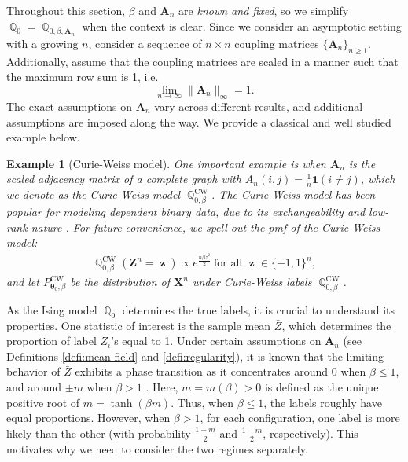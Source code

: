 \documentclass[preprint,reqno]{imsart}
\newtheorem{ex}{Example}[section]
\newcommand{\ttheta}{\boldsymbol{\theta}}
\DeclareMathOperator{\bz}{\textbf{z}}
\DeclareMathOperator{\QQ}{\mathbb{Q}}
\newcommand{\A}{\mathbf{A}}
\newcommand{\Z}{\mathbf{Z}}
\newcommand{\X}{\mathbf{X}}
\begin{document}
Throughout this section, $\beta$ and $\A_n$ are \emph{known and fixed}, so we simplify $\QQ_0 = \QQ_{0, \beta,\A_n}$ when the context is clear. Since we consider an asymptotic setting with a growing $n$, consider a sequence of $n \times n$ coupling matrices $\{\A_n\}_{n \ge 1}$. Additionally, assume that the coupling matrices are scaled in a manner such that the {maximum row sum is 1}, i.e. 
\begin{equation}\label{eq:row sum one scaling}
    \lim_{n \to \infty} \lVert \A_n \rVert_{\infty} =1.
\end{equation}
The exact assumptions on $\A_n$ vary across different results, and additional assumptions are imposed along the way. We provide a classical and well studied example below.

\begin{ex}[Curie-Weiss model]\label{ex:Curie-Weiss}
One important example is when $\A_n$ is the scaled adjacency matrix of a complete graph with $A_n(i,j) = \frac{1}{n}\mathbf{1}(i\neq j)$, which we denote as the Curie-Weiss model $\QQ_{0,\beta}^{\text{CW}}$. The Curie-Weiss model has been popular for modeling dependent binary data, due to its exchangeability and low-rank nature \citep{ellis1978statistics, comets1991asymptotics, mukherjee2018global}. 
For future convenience, we spell out the pmf of the Curie-Weiss model:
\begin{align}
    \QQ_{0,\beta}^{\text{CW}}(\Z^n = \bz) \propto e^{\frac{n \beta \bar{z}^2}{2}} ~ \mbox{for all } \bz \in \{-1, 1\}^n,\label{eq:CW pmf}
\end{align}
and let $P_{\ttheta_0, \beta}^{\text{CW}}$ be the distribution of $\X^n$ under Curie-Weiss labels $\QQ_{0,\beta}^{\text{CW}}$.
\end{ex}

As the Ising model $\QQ_0$ determines the true labels, it is crucial to understand its properties. One statistic of interest is the sample mean $\bar{Z}$, which determines the proportion of label $Z_i$'s equal to 1. 
%
Under certain assumptions on $\A_n$ (see Definitions \ref{defi:mean-field} and \ref{defi:regularity}), it is known that the limiting behavior of $\bar{Z}$ exhibits a phase transition as it concentrates around 0 when $\beta \le 1$, and around $\pm m$ when $\beta > 1$ \citep{ellis1978statistics, deb2023fluctuations}. Here, $m = m(\beta) > 0$ is defined as the unique positive root of $m = \tanh(\beta m)$. %
Thus, when $\beta \le 1$, the labels roughly have equal proportions. However, when $\beta > 1$, for each configuration, one label is more likely than the other (with probability $\frac{1+m}{2}$ and $\frac{1-m}{2}$, respectively). This motivates why we need to consider the two regimes separately.
%
\end{document}
